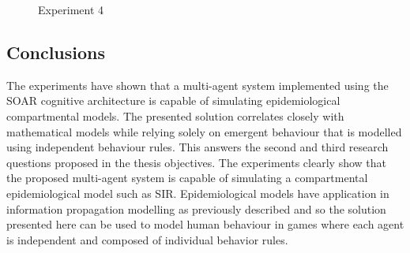 \begin{figure}[H]
    \centering
    \hspace*{\fill}
    \hspace*{\fill}

    \caption{Experiment 4} \label{fig:experiment3}
\end{figure}

\subsection{Conclusions}

The experiments have shown that a multi-agent system implemented using the SOAR cognitive architecture is capable of simulating epidemiological compartmental models.
The presented solution correlates closely with mathematical models while relying solely on emergent behaviour that is modelled using independent behaviour rules.
This answers the second and third research questions proposed in the thesis objectives.
The experiments clearly show that the proposed multi-agent system is capable of simulating a compartmental epidemiological model such as SIR.
Epidemiological models have application in information propagation modelling as previously described and so the solution presented here can be used to model human behaviour in games where each agent is independent and composed of individual behavior rules.